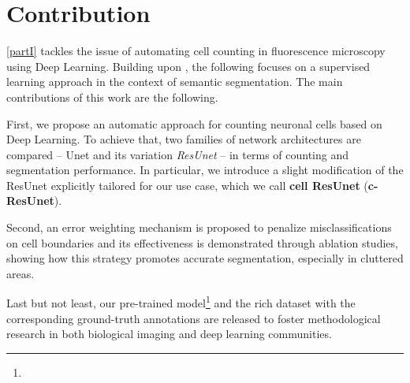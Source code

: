 \section{Contribution}
\label{sec:contribution}


\cref{partI} tackles the issue of automating cell counting in fluorescence microscopy using Deep Learning. 
Building upon , the following focuses on a supervised learning approach in the context of semantic segmentation.
The main contributions of this work are the following. 

First, we propose an automatic approach for counting neuronal cells based on Deep Learning. 
To achieve that, two families of network architectures are compared -- {Unet} and its variation \textit{ResUnet} -- in terms of counting and segmentation performance. 
In particular, we introduce a slight modification of the ResUnet explicitly tailored for our use case, which we call \textbf{cell ResUnet} (\textbf{c-ResUnet}).

Second, an error weighting mechanism is proposed to penalize misclassifications on cell boundaries and its effectiveness is demonstrated through ablation studies, showing how this strategy promotes accurate segmentation, especially in cluttered areas.

Last but not least, our pre-trained model\footnote{\linkmodel} and the rich dataset with the corresponding ground-truth annotations \cite{clissa2021fluocells} are released to foster methodological research in both biological imaging and deep learning communities.